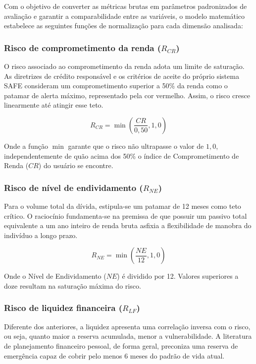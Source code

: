 \documentclass[portuguese]{sbc2025}%
\begin{document}
Com o objetivo de converter as métricas brutas em parâmetros padronizados de avaliação e garantir a comparabilidade entre as variáveis, o modelo matemático estabelece as seguintes funções de normalização para cada dimensão analisada:

\subsubsection{Risco de comprometimento da renda ($R_{CR}$)}

O risco associado ao comprometimento da renda adota um limite de saturação. As diretrizes de crédito responsável e os critérios de aceite do próprio sistema SAFE consideram um comprometimento superior a 50\% da renda como o patamar de alerta máximo, representado pela cor vermelho. Assim, o risco cresce linearmente até atingir esse teto.

\begin{equation}
R_{CR} = \min\left( \frac{CR}{0{,}50}, 1{,}0 \right)
\end{equation}

Onde a função $\min$ garante que o risco não ultrapasse o valor de $1{,}0$, independentemente de quão acima dos 50\% o índice de Comprometimento de Renda ($CR$) do usuário se encontre.

\subsubsection{Risco de nível de endividamento ($R_{NE}$)}

Para o volume total da dívida, estipula-se um patamar de 12 meses como teto crítico. O raciocínio fundamenta-se na premissa de que possuir um passivo total equivalente a um ano inteiro de renda bruta asfixia a flexibilidade de manobra do indivíduo a longo prazo.

\begin{equation}
R_{NE} = \min\left( \frac{NE}{12}, 1{,}0 \right)
\end{equation}

Onde o Nível de Endividamento ($NE$) é dividido por 12. Valores superiores a doze resultam na saturação máxima do risco.

\subsubsection{Risco de liquidez financeira ($R_{LF}$)}

Diferente dos anteriores, a liquidez apresenta uma correlação inversa com o risco, ou seja, quanto maior a reserva acumulada, menor a vulnerabilidade. A literatura de planejamento financeiro pessoal, de forma geral, preconiza uma reserva de emergência capaz de cobrir pelo menos 6 meses do padrão de vida atual.
\end{document}
